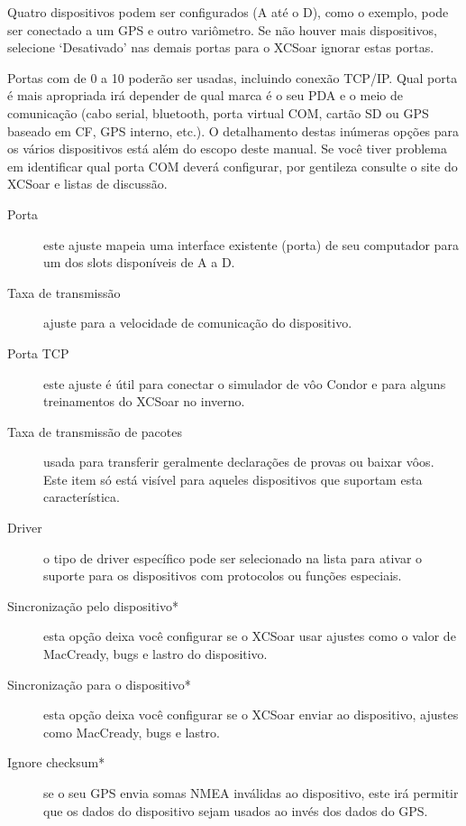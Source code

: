 Quatro dispositivos podem ser configurados (A até o D), como o exemplo, pode ser conectado a um GPS e outro variômetro.  Se não houver mais dispositivos, selecione ‘Desativado’ nas demais portas para o XCSoar ignorar estas portas.


Portas com de 0 a 10 poderão ser usadas, incluindo conexão TCP/IP.  Qual porta é mais apropriada irá depender de qual marca é o seu PDA e o meio de comunicação (cabo serial, bluetooth, porta virtual COM, cartão SD ou GPS baseado em CF, GPS interno, etc.).  O detalhamento destas inúmeras opções para os vários dispositivos está além do escopo deste manual.  Se você tiver problema em identificar qual porta COM deverá configurar, por gentileza consulte o site do XCSoar e listas de discussão.  

\begin{description}
\item[Porta] este ajuste mapeia uma interface existente (porta) de seu computador para um dos slots disponíveis de A a D.
\item[Taxa de transmissão]  ajuste para a velocidade de comunicação do dispositivo.
\item[Porta TCP]  este ajuste é útil para conectar o simulador de vôo Condor e para alguns treinamentos do XCSoar no inverno.
\item[Taxa de transmissão de pacotes]  usada para transferir geralmente declarações de provas ou baixar vôos.  Este item só está visível para aqueles dispositivos que suportam esta característica.
\item[Driver] o tipo de driver específico pode ser selecionado na lista para ativar o suporte para os dispositivos com protocolos ou funções especiais.
\item[Sincronização pelo dispositivo*]  esta opção deixa você configurar se o XCSoar usar ajustes como o valor de MacCready, bugs e lastro do dispositivo.
\item[Sincronização para o dispositivo*]  esta opção deixa você configurar se o XCSoar enviar ao dispositivo, ajustes como MacCready, bugs e lastro.
\item[Ignore checksum*] se o seu GPS envia somas NMEA inválidas ao dispositivo, este irá permitir que os dados do dispositivo sejam usados ao invés dos dados do GPS. 
\end{description}

